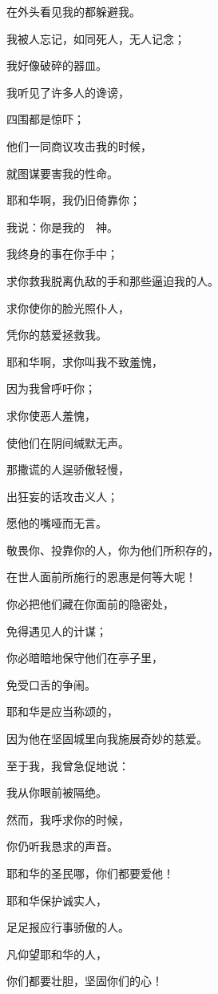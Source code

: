 {\par }{\Q 在外头看见我的都躲避我。
\par }{\Q {}我被人忘记，如同死人，无人记念；
\par }{\Q 我好像破碎的器皿。
\par }{\Q {}我听见了许多人的谗谤，
\par }{\Q 四围都是惊吓；
\par }{\Q 他们一同商议攻击我的时候，
\par }{\Q 就图谋要害我的性命。
\par }{\BB \par }{\Q {}耶和华啊，我仍旧倚靠你；
\par }{\Q 我说：你是我的　神。
\par }{\Q {}我终身的事在你手中；
\par }{\Q 求你救我脱离仇敌的手和那些逼迫我的人。
\par }{\Q {}求你使你的脸光照仆人，
\par }{\Q 凭你的慈爱拯救我。
\par }{\Q {}耶和华啊，求你叫我不致羞愧，
\par }{\Q 因为我曾呼吁你；
\par }{\Q 求你使恶人羞愧，
\par }{\Q 使他们在阴间缄默无声。
\par }{\Q {}那撒谎的人逞骄傲轻慢，
\par }{\Q 出狂妄的话攻击义人；
\par }{\Q 愿他的嘴哑而无言。
\par }{\BB \par }{\Q {}敬畏你、投靠你的人，你为他们所积存的，
\par }{\Q 在世人面前所施行的恩惠是何等大呢！
\par }{\Q {}你必把他们藏在你面前的隐密处，
\par }{\Q 免得遇见人的计谋；
\par }{\Q 你必暗暗地保守他们在亭子里，
\par }{\Q 免受口舌的争闹。
\par }{\BB \par }{\Q {}耶和华是应当称颂的，
\par }{\Q 因为他在坚固城里向我施展奇妙的慈爱。
\par }{\Q {}至于我，我曾急促地说：
\par }{\Q 我从你眼前被隔绝。
\par }{\Q 然而，我呼求你的时候，
\par }{\Q 你仍听我恳求的声音。
\par }{\BB \par }{\Q {}耶和华的圣民哪，你们都要爱他！
\par }{\Q 耶和华保护诚实人，
\par }{\Q 足足报应行事骄傲的人。
\par }{\Q {}凡仰望耶和华的人，
\par }{\Q 你们都要壮胆，坚固你们的心！

}
